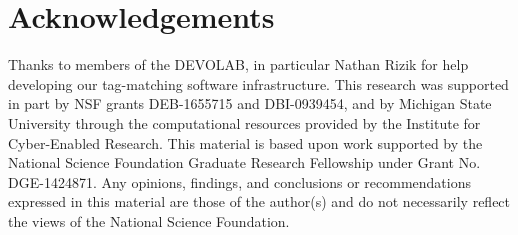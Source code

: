 \section{Acknowledgements}

Thanks to members of the DEVOLAB, in particular Nathan Rizik for help developing our tag-matching software infrastructure.
This research was supported in part by NSF grants DEB-1655715 and DBI-0939454, and by Michigan State University through the computational resources provided by the Institute for Cyber-Enabled Research.
This material is based upon work supported by the National Science Foundation Graduate Research Fellowship under Grant No. DGE-1424871.
Any opinions, findings, and conclusions or recommendations expressed in this material are those of the author(s) and do not necessarily reflect the views of the National Science Foundation.
